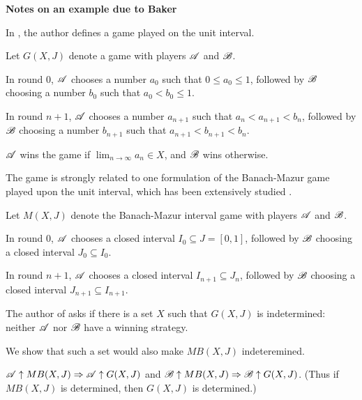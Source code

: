 

\usepackage{hyperref}



\textbf{Notes on an example due to Baker}

In \cite{baker}, the author defines a game played on the unit interval.

\begin{game}
  Let $G(X,J)$ denote a game with players $\mathscr{A}$ and $\mathscr{B}$.

  In round 0, $\mathscr{A}$ chooses a number $a_0$ such that $0\leq a_0\leq 1$, 
  followed by $\mathscr{B}$ choosing a number $b_0$ such that $a_0<b_0\leq 1$.

  In round $n+1$, $\mathscr{A}$ chooses a number $a_{n+1}$ such that 
  $a_n<a_{n+1}< b_n$, followed by $\mathscr{B}$ choosing a number $b_{n+1}$ such
  that $a_{n+1}< b_{n+1}<b_n$.

  $\mathscr{A}$ wins the game if $\lim_{n\to\infty}a_n\in X$, and $\mathscr{B}$ wins
  otherwise.
\end{game}

The game is strongly related to one formulation of the Banach-Mazur game
played upon the unit interval, which has been extensively studied
\cite{telgarsky}.

\begin{game}
  Let $M(X,J)$ denote the Banach-Mazur interval game with players $\mathscr{A}$ and
  $\mathscr{B}$.

  In round 0, $\mathscr{A}$ chooses a closed interval $I_0\subseteq J=[0,1]$,
  followed by $\mathscr{B}$ choosing a closed interval $J_0\subseteq I_0$.

  In round $n+1$, $\mathscr{A}$ chooses a closed interval $I_{n+1}\subseteq J_n$,
  followed by $\mathscr{B}$ choosing a closed interval $J_{n+1}\subseteq I_{n+1}$.
\end{game}

The author of \cite{baker} asks if there is a set $X$ such that $G(X,J)$ is
indetermined: neither $\mathscr{A}$ nor $\mathscr{B}$ have a winning strategy.

We show that such a set would also make $MB(X,J)$ indeteremined.

\begin{theorem}
  $\mathscr{A}\uparrow MB(X,J) \Rightarrow \mathscr{A}\uparrow G(X,J)$ and
  $\mathscr{B}\uparrow MB(X,J) \Rightarrow \mathscr{B}\uparrow G(X,J)$.
  (Thus if $MB(X,J)$ is determined, then $G(X,J)$ is determined.)
\end{theorem}

